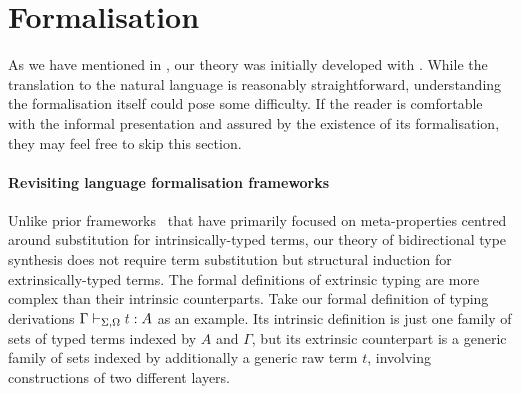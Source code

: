\documentclass[BiSig.tex]{subfiles}
\begin{document}
\section{Formalisation} \label{sec:formalisation}
As we have mentioned in , our theory was initially developed with \Agda.
While the translation to the natural language is reasonably straightforward, understanding the formalisation itself could pose some difficulty.
If the reader is comfortable with the informal presentation and assured by the existence of its formalisation, they may feel free to skip this section.

\paragraph{Revisiting language formalisation frameworks}
Unlike prior frameworks~\citep{Allais2021,Fiore2022,Ahrens2022} that have primarily focused on meta-properties centred around substitution for intrinsically-typed terms, our theory of bidirectional type synthesis does not require term substitution but structural induction for extrinsically-typed terms.
The formal definitions of extrinsic typing are more complex than their intrinsic counterparts.
Take our formal definition of typing derivations $\Gamma \vdash_{\Sigma, \Omega} \isTerm{t} : A$ as an example.
Its intrinsic definition is just one family of sets of typed terms indexed by $A$ and $\Gamma$, but its extrinsic counterpart is a generic family of sets indexed by additionally a generic raw term $t$, involving constructions of two different layers.
\end{document}
